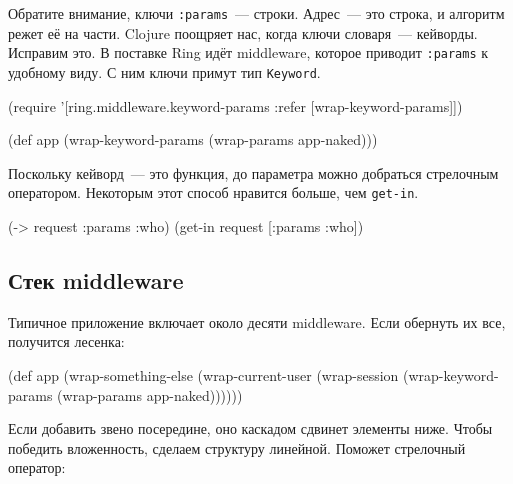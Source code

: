 
Обратите внимание, ключи \verb|:params|~--- строки. Адрес~--- это строка, и
алгоритм режет её на части. Clojure поощряет нас, когда ключи словаря~---
кейворды. Исправим это. В поставке Ring идёт middleware, которое приводит
\verb|:params| к удобному виду. С ним ключи примут тип \verb|Keyword|.


\begin{english}
  \begin{clojure}
(require '[ring.middleware.keyword-params
           :refer [wrap-keyword-params]])

(def app (wrap-keyword-params
           (wrap-params app-naked)))
  \end{clojure}
\end{english}


Поскольку кейворд~--- это функция, до параметра можно добраться стрелочным
оператором. Некоторым этот способ нравится больше, чем \verb|get-in|.

\begin{english}
  \begin{clojure}
(-> request :params :who)
(get-in request [:params :who])
  \end{clojure}
\end{english}

\subsection{Стек middleware}

Типичное приложение включает около десяти middleware. Если обернуть их все,
получится лесенка:

\begin{english}
  \begin{clojure}
(def app
  (wrap-something-else
    (wrap-current-user
      (wrap-session
        (wrap-keyword-params
          (wrap-params app-naked))))))
  \end{clojure}
\end{english}


Если добавить звено посередине, оно каскадом сдвинет элементы ниже. Чтобы
победить вложенность, сделаем структуру линейной. Поможет стрелочный оператор:


